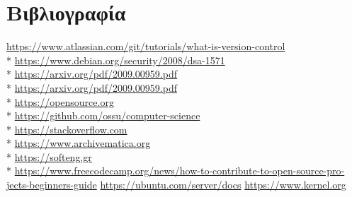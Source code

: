 \documentclass[a4paper, 11pt]{article}
\begin{document}
{{\section{Βιβλιογραφία}
\textlatin{\href{https://www.atlassian.com/git/tutorials/what-is-version-control}{https://www.atlassian.com/git/tutorials/what-is-version-control}}\\*
\textlatin{\href{https://www.debian.org/security/2008/dsa-1571}{https://www.debian.org/security/2008/dsa-1571}}\\*
\textlatin{\href{https://arxiv.org/pdf/2009.00959.pdf}{https://arxiv.org/pdf/2009.00959.pdf}}\\*
\textlatin{\href{https://arxiv.org/pdf/2009.00959.pdf}{https://arxiv.org/pdf/2009.00959.pdf}}\\*
\textlatin{\href{https://opensource.org}{https://opensource.org}}\\*
\textlatin{\href{https://github.com/ossu/computer-science}{https://github.com/ossu/computer-science}}\\*
\textlatin{\href{https://stackoverflow.com}{https://stackoverflow.com}}\\*
\textlatin{\href{https://www.archivematica.org}{https://www.archivematica.org}}\\*
\textlatin{\href{https://softeng.gr}{https://softeng.gr}}\\*
\textlatin{\href{https://www.freecodecamp.org/news/how-to-contribute-to-open-source-projects-beginners-guide}{https://www.freecodecamp.org/news/how-to-contribute-to-open-source-projects-beginners-guide}}
\textlatin{\href{https://ubuntu.com/server/docs}{https://ubuntu.com/server/docs}}
\textlatin{\href{https://www.kernel.org}{https://www.kernel.org}}



}} %
\end{document}
